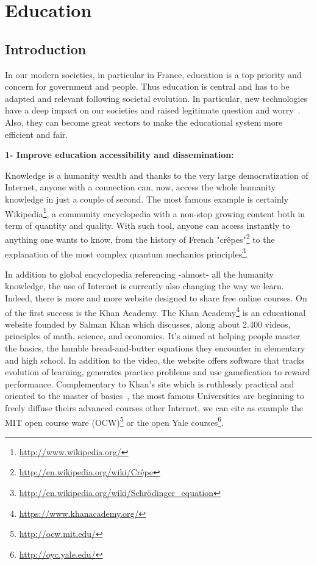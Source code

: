 

\cleartoleftpage


\chapter{Education} %


\section{Introduction} %

In our modern societies, in particular in France, education is a top priority and concern for government and people. Thus education is central and has to be adapted and relevant following societal evolution. In particular, new technologies have a deep impact on our societies and raised legitimate question and worry~\cite{plester2008txt}. Also, they can become great vectors to make the educational system more efficient and fair.


\textbf{1- Improve education accessibility and dissemination:}

Knowledge is a humanity wealth and thanks to the very large democratization of Internet, anyone with a connection can, now, access the whole humanity knowledge in just a couple of second. The most famous example is certainly Wikipedia\footnote{\url{http://www.wikipedia.org/}}, a community encyclopedia with a non-stop growing content both in term of quantity and quality. With such tool, anyone can access instantly to anything one wants to know, from the history of French "crêpes"\footnote{\url{http://en.wikipedia.org/wiki/Crêpe}} to the explanation of the most complex quantum mechanics principles\footnote{\url{http://en.wikipedia.org/wiki/Schrödinger_equation}}.

In addition to global encyclopedia  referencing -almost- all the humanity knowledge, the use of Internet is currently also changing the way we learn. Indeed, there is more and more website designed to share free online courses. On of the first success is the Khan Academy.
The Khan Academy\footnote{\url{https://www.khanacademy.org/}} is an educational website founded by Salman Khan which discusses, along about 2.400 videos, principles of math, science, and economics.  It's aimed at helping people master the basics, the humble bread-and-butter equations they encounter in elementary and high school. In addition to the video, the website offers software that tracks evolution of learning, generates practice problems and use gamefication to reward performance.
Complementary to Khan's site which is ruthlessly practical and oriented to the master of basics~\cite{thompson2011khan}, the most famous Universities are beginning to freely diffuse theirs advanced courses other Internet, we can cite as example the MIT open course ware (OCW)\footnote{\url{http://ocw.mit.edu/}} or the open Yale courses\footnote{\url{http://oyc.yale.edu/}}.

